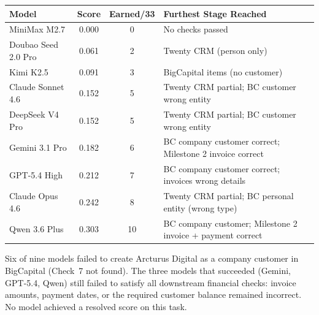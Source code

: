 \begin{table}[h]
\centering
\small
\renewcommand{\arraystretch}{1.1}
\begin{tabular}{lccl}
\toprule
\textbf{Model} & \textbf{Score} & \textbf{Earned/33} & \textbf{Furthest Stage Reached} \\
\midrule
MiniMax M2.7 & 0.000 & 0 & No checks passed \\
Doubao Seed 2.0 Pro & 0.061 & 2 & Twenty CRM (person only) \\
Kimi K2.5 & 0.091 & 3 & BigCapital items (no customer) \\
Claude Sonnet 4.6 & 0.152 & 5 & Twenty CRM partial; BC customer wrong entity \\
DeepSeek V4 Pro & 0.152 & 5 & Twenty CRM partial; BC customer wrong entity \\
Gemini 3.1 Pro & 0.182 & 6 & BC company customer correct; Milestone 2 invoice correct \\
GPT-5.4 High & 0.212 & 7 & BC company customer correct; invoices wrong details \\
Claude Opus 4.6 & 0.242 & 8 & Twenty CRM partial; BC personal entity (wrong type) \\
Qwen 3.6 Plus & 0.303 & 10 & BC company customer; Milestone 2 invoice + payment correct \\
\bottomrule
\end{tabular}
\end{table}

Six of nine models failed to create Arcturus Digital as a company customer in BigCapital (Check~7 not found). The three models that succeeded (Gemini, GPT-5.4, Qwen) still failed to satisfy all downstream financial checks: invoice amounts, payment dates, or the required customer balance remained incorrect. No model achieved a resolved score on this task.

